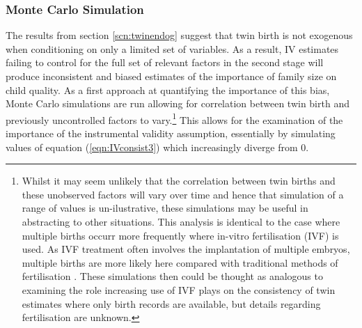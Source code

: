\documentclass{article}[11pt,subeqn]
\begin{document}
\begin{spacing}{1.25}
\subsubsection{Monte Carlo Simulation}
\label{scn:MCS}
The results from section \ref{scn:twinendog} suggest that twin birth is not exogenous when conditioning on only a limited set of variables. As a result, 
IV estimates failing to control for the full set of 
relevant factors in the second stage will produce inconsistent and biased estimates of the importance of family size on child quality.  As a first 
approach at quantifying the importance of this bias, Monte Carlo simulations are run allowing for correlation between twin birth and previously uncontrolled factors
to vary.\footnote{Whilst it may seem unlikely that the correlation between twin births and these unobserved factors will vary over time and hence that
simulation of a range of values is un-ilustrative, these simulations may be useful in abstracting to other situations.  This analysis is identical to the
case where multiple births occurr more frequently where in-vitro fertilisation (IVF) is used.  As IVF treatment often involves the implantation of 
multiple embryos, multiple births are more likely here compared with traditional methods of fertilisation \citep{Beraletal1990}.  These simulations then could be 
thought as analogous to examining the role increasing use of IVF plays on the consistency of twin estimates where only birth records are available, 
but details regarding fertilisation are unknown.}  This allows for the examination of the importance of the instrumental validity assumption, essentially
by simulating values of equation (\ref{eqn:IVconsist3}) which increasingly diverge from 0. 


\end{spacing}
\end{document}

